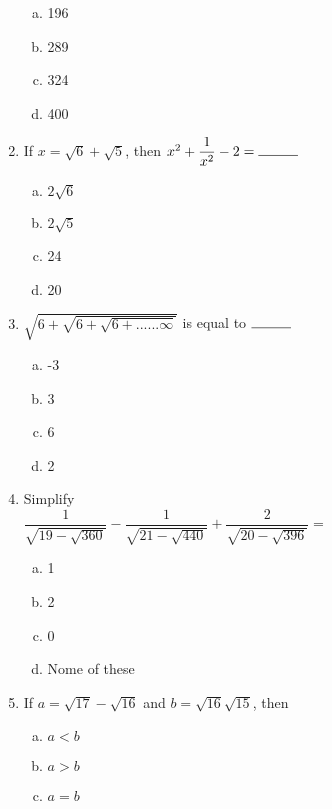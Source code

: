 \begin{multicols}{2}
\begin{enumerate}
\begin{multicols}{2}
\begin{enumerate}[(a)]
\item 196
\item 289
\item 324
\item 400
\end{enumerate}
\end{multicols}
\item If $x = \sqrt{6}+\sqrt{5}$, then $x^2+\dfrac{1}{x^2}-2 = \rule{1cm}{0.15mm}$
\begin{multicols}{2}
\begin{enumerate}[(a)]
\item $2\sqrt{6}$
\item $2\sqrt{5}$
\item 24
\item 20
\end{enumerate}
\end{multicols}
\item $\sqrt{6+\sqrt{6+\sqrt{6+......\infty}}}$ is equal to $\rule{1cm}{0.15mm}$
\begin{multicols}{2}
\begin{enumerate}[(a)]
\item -3
\item 3
\item 6
\item 2
\end{enumerate}
\end{multicols}
\item Simplify\\
$\dfrac{1}{\sqrt{19-\sqrt{360}}}-\dfrac{1}{\sqrt{21-\sqrt{440}}}+\dfrac{2}{\sqrt{20-\sqrt{396}}} =$ %
\begin{multicols}{2}
\begin{enumerate}[(a)]
\item 1
\item 2
\item 0
\item Nome of these
\end{enumerate}
\end{multicols}
\item If $a = \sqrt{17}-\sqrt{16}$ and $b = \sqrt{16}\sqrt{15}$, then 
\begin{multicols}{2}
\begin{enumerate}[(a)]
\item $a < b$
\item $a > b$
\item $a = b$

\end{enumerate}
\end{multicols}
\end{enumerate}
\end{multicols}
